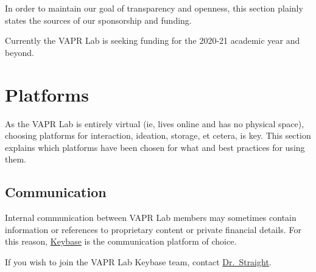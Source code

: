 \documentclass[12pt,]{memoir}
\begin{document}
In order to maintain our goal of transparency and openness, this section plainly states the sources of our sponsorship and funding.

Currently the VAPR Lab is seeking funding for the 2020-21 academic year and beyond.

\hypertarget{platforms}{%
\chapter{Platforms}\label{platforms}}

As the VAPR Lab is entirely virtual (ie, lives online and has no physical space), choosing platforms for interaction, ideation, storage, et cetera, is key. This section explains which platforms have been chosen for what and best practices for using them.

\hypertarget{communication}{%
\section{Communication}\label{communication}}

Internal communication between VAPR Lab members may sometimes contain information or references to proprietary content or private financial details. For this reason, \href{https://keybase.io}{Keybase} is the communication platform of choice.

If you wish to join the VAPR Lab Keybase team, contact \href{https://keybase.io/ryanstraight}{Dr.~Straight}.


\end{document}
